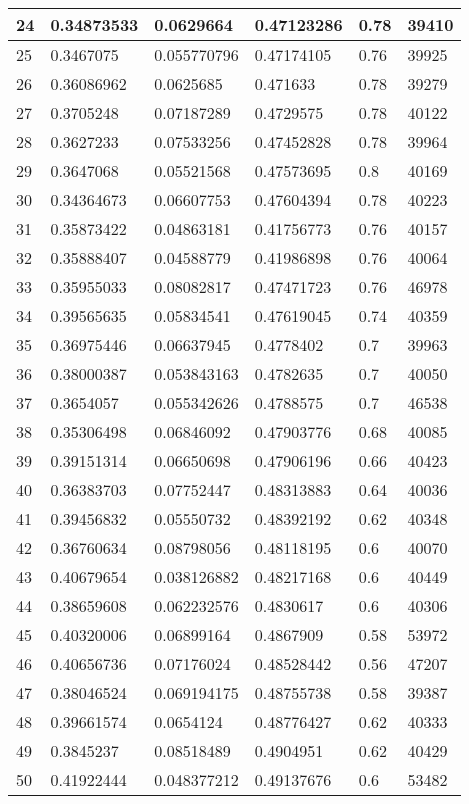 \begin{longtable}{|l|l|l|l|l|l|}
24 & 0.34873533 & 0.0629664 & 0.47123286 & 0.78 & 39410 \\ \hline 
25 & 0.3467075 & 0.055770796 & 0.47174105 & 0.76 & 39925 \\ \hline 
26 & 0.36086962 & 0.0625685 & 0.471633 & 0.78 & 39279 \\ \hline 
27 & 0.3705248 & 0.07187289 & 0.4729575 & 0.78 & 40122 \\ \hline 
28 & 0.3627233 & 0.07533256 & 0.47452828 & 0.78 & 39964 \\ \hline 
29 & 0.3647068 & 0.05521568 & 0.47573695 & 0.8 & 40169 \\ \hline 
30 & 0.34364673 & 0.06607753 & 0.47604394 & 0.78 & 40223 \\ \hline 
31 & 0.35873422 & 0.04863181 & 0.41756773 & 0.76 & 40157 \\ \hline 
32 & 0.35888407 & 0.04588779 & 0.41986898 & 0.76 & 40064 \\ \hline 
33 & 0.35955033 & 0.08082817 & 0.47471723 & 0.76 & 46978 \\ \hline 
34 & 0.39565635 & 0.05834541 & 0.47619045 & 0.74 & 40359 \\ \hline 
35 & 0.36975446 & 0.06637945 & 0.4778402 & 0.7 & 39963 \\ \hline 
36 & 0.38000387 & 0.053843163 & 0.4782635 & 0.7 & 40050 \\ \hline 
37 & 0.3654057 & 0.055342626 & 0.4788575 & 0.7 & 46538 \\ \hline 
38 & 0.35306498 & 0.06846092 & 0.47903776 & 0.68 & 40085 \\ \hline 
39 & 0.39151314 & 0.06650698 & 0.47906196 & 0.66 & 40423 \\ \hline 
40 & 0.36383703 & 0.07752447 & 0.48313883 & 0.64 & 40036 \\ \hline 
41 & 0.39456832 & 0.05550732 & 0.48392192 & 0.62 & 40348 \\ \hline 
42 & 0.36760634 & 0.08798056 & 0.48118195 & 0.6 & 40070 \\ \hline 
43 & 0.40679654 & 0.038126882 & 0.48217168 & 0.6 & 40449 \\ \hline 
44 & 0.38659608 & 0.062232576 & 0.4830617 & 0.6 & 40306 \\ \hline 
45 & 0.40320006 & 0.06899164 & 0.4867909 & 0.58 & 53972 \\ \hline 
46 & 0.40656736 & 0.07176024 & 0.48528442 & 0.56 & 47207 \\ \hline 
47 & 0.38046524 & 0.069194175 & 0.48755738 & 0.58 & 39387 \\ \hline 
48 & 0.39661574 & 0.0654124 & 0.48776427 & 0.62 & 40333 \\ \hline 
49 & 0.3845237 & 0.08518489 & 0.4904951 & 0.62 & 40429 \\ \hline 
50 & 0.41922444 & 0.048377212 & 0.49137676 & 0.6 & 53482 \\ \hline 
\end{longtable}